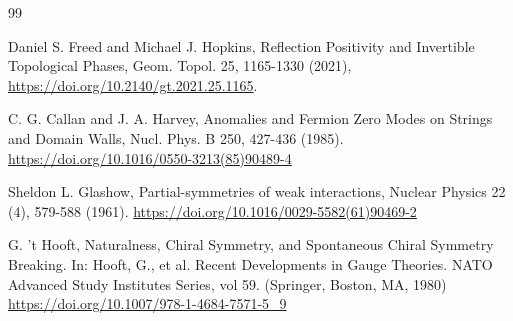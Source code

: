 \documentclass[12pt,a4paper]{article}
\begin{document}
\begin{thebibliography}{99}
	
	Daniel S. Freed and Michael J. Hopkins,
	Reflection Positivity and Invertible Topological Phases,
	Geom. Topol. 25, 1165-1330 (2021),
	\url{https://doi.org/10.2140/gt.2021.25.1165}.
	
	
	C. G. Callan and J. A. Harvey,
	Anomalies and Fermion Zero Modes on Strings and Domain Walls,
	Nucl. Phys. B 250, 427-436 (1985).
	\url{https://doi.org/10.1016/0550-3213(85)90489-4}
	
	
	Sheldon L. Glashow,
	Partial-symmetries of weak interactions,	
	Nuclear Physics 22 (4), 579-588 (1961).
	\url{https://doi.org/10.1016/0029-5582(61)90469-2}
	
	
	G. 't Hooft,
	Naturalness, Chiral Symmetry, and Spontaneous Chiral Symmetry Breaking. In: Hooft, G., et al. Recent Developments in Gauge Theories. NATO Advanced Study Institutes Series, vol 59.
	(Springer, Boston, MA, 1980) 
	\url{https://doi.org/10.1007/978-1-4684-7571-5_9}		
\end{thebibliography}
\end{document}
